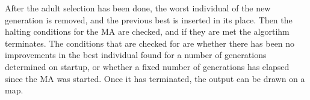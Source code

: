 After the adult selection has been done, the worst individual of the new generation is removed, and the previous best is inserted in its place. Then the halting conditions for the MA are checked, and if they are met the algortihm terminates. The conditions that are checked for are whether there has been no improvements in the best individual found for a number of generations determined on startup, or whether a fixed number of generations has elapsed since the MA was started. Once it has terminated, the output can be drawn on a map.













